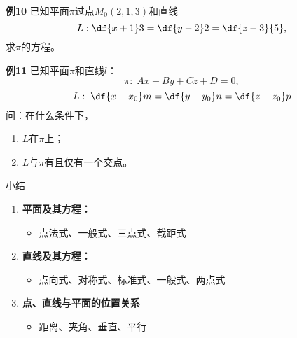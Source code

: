 \begin{frame}
	\linespread{1.2}
	\begin{exampleblock}{{\bf 例10}\hfill}
		已知平面$\pi$过点$M_0(2,1,3)$和直线
		$$L:\df{x+1}3=\df{y-2}2=\df{z-3}{5},$$
		求$\pi$的方程。
	\end{exampleblock}
\end{frame}

\begin{frame}
	\linespread{1.2}
	\begin{exampleblock}{{\bf 例11}}
		已知平面$\pi$和直线$l$：
		$$\pi:\;Ax+By+Cz+D=0,$$
		$$L:\;\df{x-x_0}m=\df{y-y_0}n=\df{z-z_0}p$$
		问：在什么条件下，
		\begin{enumerate}
		  \item $L$在$\pi$上；
		  \item $L$与$\pi$有且仅有一个交点。
		\end{enumerate}
	\end{exampleblock}
\end{frame}

\begin{frame}{小结}
	\linespread{1.5}
	\begin{enumerate}\pause 
	  \item {\bf 平面及其方程：}\pause 
	  \begin{itemize}
	    \item 点法式、一般式、三点式、截距式\pause 
	  \end{itemize}
	  \item {\bf 直线及其方程：}\pause 
	  \begin{itemize}
	    \item 点向式、对称式、标准式、一般式、两点式\pause 
	  \end{itemize}
	  \item {\bf 点、直线与平面的位置关系}\pause 
	  \begin{itemize}
	    \item 距离、夹角、垂直、平行\pause 
	  \end{itemize}
	\end{enumerate}
	\vspace{-1em}
	\begin{center}
	\end{center}
	
\end{frame}

